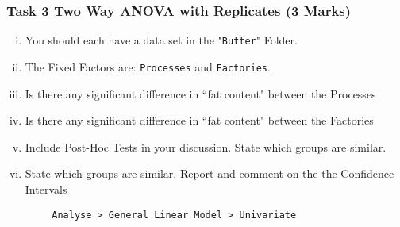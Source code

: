 \documentclass[a4paper,12pt]{article}
\begin{document}
\subsubsection*{Task 3 Two Way ANOVA with Replicates (3 Marks)}
\begin{enumerate}[(i)]
\item You should each have a data set in the "\texttt{Butter}" Folder.
	\item The Fixed Factors are: \texttt{Processes} and \texttt{Factories}.
\item Is there any significant difference in ``fat content" between the Processes
\item Is there any significant difference in ``fat content" between the Factories
\item Include Post-Hoc Tests in your discussion. State which groups are similar.
	\item State which groups are similar. Report and comment on the the Confidence Intervals
\end{enumerate}


	\begin{framed}
		\begin{verbatim}
		Analyse > General Linear Model > Univariate
		\end{verbatim}
	\end{framed}
\end{document}
